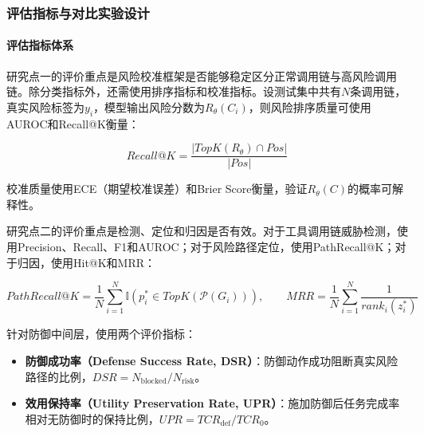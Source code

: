 \subsubsection{评估指标与对比实验设计}

\paragraph{评估指标体系}

研究点一的评价重点是风险校准框架是否能够稳定区分正常调用链与高风险调用链。除分类指标外，还需使用排序指标和校准指标。设测试集中共有$N$条调用链，真实风险标签为$y_i$，模型输出风险分数为$R_\theta(C_i)$，则风险排序质量可使用AUROC和Recall@K衡量：

\begin{equation}
  Recall@K = \frac{|TopK(R_\theta) \cap Pos|}{|Pos|}
\end{equation}

校准质量使用ECE（期望校准误差）和Brier Score衡量，验证$R_\theta(C)$的概率可解释性。

研究点二的评价重点是检测、定位和归因是否有效。对于工具调用链威胁检测，使用Precision、Recall、F1和AUROC；对于风险路径定位，使用PathRecall@K；对于归因，使用Hit@K和MRR：

\begin{equation}
  PathRecall@K = \frac{1}{N} \sum_{i=1}^{N} \mathbb{I}(p_i^* \in TopK(\mathcal{P}(G_i))), \qquad
  MRR = \frac{1}{N} \sum_{i=1}^{N} \frac{1}{rank_i(z_i^*)}
\end{equation}

针对防御中间层，使用两个评价指标：

\begin{itemize}
  \item \textbf{防御成功率（Defense Success Rate, DSR）}：防御动作成功阻断真实风险路径的比例，$DSR = N_{\text{blocked}} / N_{\text{risk}}$。
  \item \textbf{效用保持率（Utility Preservation Rate, UPR）}：施加防御后任务完成率相对无防御时的保持比例，$UPR = TCR_{\text{def}} / TCR_0$。
\end{itemize}


